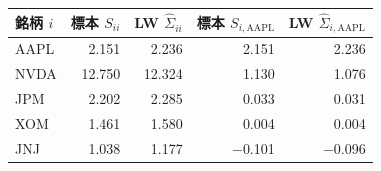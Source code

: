 \begin{tabular}{lrrrr}
\toprule
銘柄 $i$ & 標本 $S_{ii}$ & LW $\hat\Sigma_{ii}$ & 標本 $S_{i,\mathrm{AAPL}}$ & LW $\hat\Sigma_{i,\mathrm{AAPL}}$ \\
\midrule
AAPL & 2.151 & 2.236 & 2.151 & 2.236 \\
NVDA & 12.750 & 12.324 & 1.130 & 1.076 \\
JPM & 2.202 & 2.285 & 0.033 & 0.031 \\
XOM & 1.461 & 1.580 & 0.004 & 0.004 \\
JNJ & 1.038 & 1.177 & \ensuremath{-}0.101 & \ensuremath{-}0.096 \\
\bottomrule
\end{tabular}
